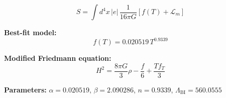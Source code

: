 
\begin{equation}
  S = \int d^4x \, |e| \, \frac{1}{16\pi G} \left[ f(T) + \mathcal{L}_m \right]
\end{equation}

\textbf{Best-fit model:}
\begin{equation}
  f(T) = 0.020519 \, T^{0.9339}
\end{equation}

\textbf{Modified Friedmann equation:}
\begin{equation}
  H^2 = \frac{8\pi G}{3} \rho - \frac{f}{6} + \frac{T f_T}{3}
\end{equation}

\textbf{Parameters:}
$\alpha = 0.020519$, \quad
$\beta = 2.090286$, \quad
$n = 0.9339$, \quad
$\Lambda_{\text{BI}} = 560.0555$